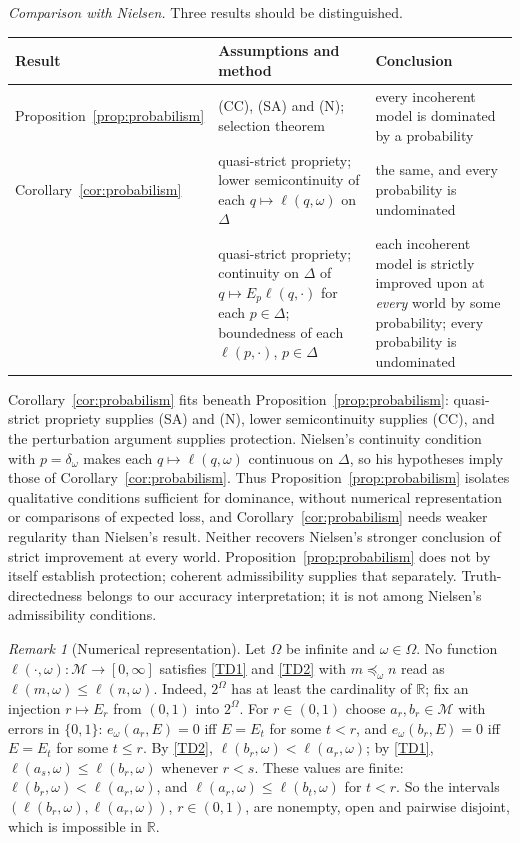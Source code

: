 \documentclass[11pt]{article}
\newenvironment{chgblockb}{\color{violet}}{}
\theoremstyle{definition}
\theoremstyle{remark}
\newtheorem{remark}[theorem]{Remark}
\newcommand{\M}{\mathcal M}
\begin{document}
\begin{chgblockb}
\emph{Comparison with Nielsen.} Three results should be distinguished.
\begin{center}
\small
\begin{tabular}{p{}p{}p{}}
\hline
Result & Assumptions and method & Conclusion\\\hline
Proposition~\ref{prop:probabilism} & (CC), (SA) and (N); selection theorem & every incoherent model is dominated by a probability\\
Corollary~\ref{cor:probabilism} & quasi-strict propriety; lower semicontinuity of each $q\mapsto\ell(q,\omega)$ on $\Delta$ & the same, and every probability is undominated\\
\cite[Theorems~1--2]{Nielsen2023} & quasi-strict propriety; continuity on $\Delta$ of $q\mapsto E_p\ell(q,\cdot)$ for each $p\in\Delta$; boundedness of each $\ell(p,\cdot)$, $p\in\Delta$ & each incoherent model is strictly improved upon at \emph{every} world by some probability; every probability is undominated\\\hline
\end{tabular}
\end{center}
Corollary~\ref{cor:probabilism} fits beneath Proposition~\ref{prop:probabilism}: quasi-strict propriety supplies (SA) and (N), lower semicontinuity supplies (CC), and the perturbation argument supplies protection. Nielsen's continuity condition with $p=\delta_\omega$ makes each $q\mapsto\ell(q,\omega)$ continuous on $\Delta$, so his hypotheses imply those of Corollary~\ref{cor:probabilism}. Thus Proposition~\ref{prop:probabilism} isolates qualitative conditions sufficient for dominance, without numerical representation or comparisons of expected loss, and Corollary~\ref{cor:probabilism} needs weaker regularity than Nielsen's result. Neither recovers Nielsen's stronger conclusion of strict improvement at every world. Proposition~\ref{prop:probabilism} does not by itself establish protection; coherent admissibility supplies that separately. Truth-directedness belongs to our accuracy interpretation; it is not among Nielsen's admissibility conditions.

\begin{remark}[Numerical representation]\label{rem:numerical-TD}
Let $\Omega$ be infinite and $\omega\in\Omega$. No function $\ell(\cdot,\omega):\M\to[0,\infty]$ satisfies \ref{TD1} and \ref{TD2} with $m\preceq_\omega n$ read as $\ell(m,\omega)\le\ell(n,\omega)$. Indeed, $2^\Omega$ has at least the cardinality of $\mathbb R$; fix an injection $r\mapsto E_r$ from $(0,1)$ into $2^\Omega$. For $r\in(0,1)$ choose $a_r,b_r\in\M$ with errors in $\{0,1\}$: $e_\omega(a_r,E)=0$ iff $E=E_t$ for some $t<r$, and $e_\omega(b_r,E)=0$ iff $E=E_t$ for some $t\le r$. By \ref{TD2}, $\ell(b_r,\omega)<\ell(a_r,\omega)$; by \ref{TD1}, $\ell(a_s,\omega)\le\ell(b_r,\omega)$ whenever $r<s$. These values are finite: $\ell(b_r,\omega)<\ell(a_r,\omega)$, and $\ell(a_r,\omega)\le\ell(b_t,\omega)$ for $t<r$. So the intervals $(\ell(b_r,\omega),\ell(a_r,\omega))$, $r\in(0,1)$, are nonempty, open and pairwise disjoint, which is impossible in $\mathbb R$.


\end{remark}
\end{chgblockb}
\end{document}
